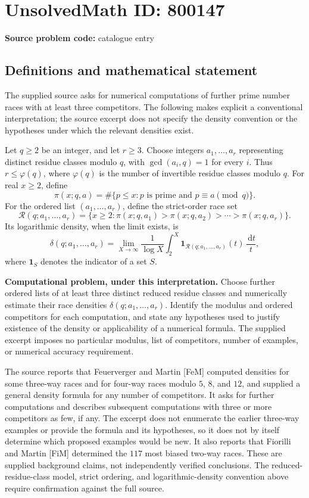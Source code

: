 \documentclass[11pt]{article}
\newcommand{\dd}{\,\mathrm{d}}
\begin{document}
\section*{UnsolvedMath ID: 800147}
\textbf{Source problem code:} catalogue entry
\subsection{Definitions and mathematical statement}
The supplied source asks for numerical computations of further prime number races with at least three competitors. The following makes explicit a conventional interpretation; the source excerpt does not specify the density convention or the hypotheses under which the relevant densities exist.

Let \(q\geq 2\) be an integer, and let \(r\geq 3\). Choose integers \(a_1,\ldots,a_r\) representing distinct residue classes modulo \(q\), with \(\gcd(a_i,q)=1\) for every \(i\). Thus \(r\leq\varphi(q)\), where \(\varphi(q)\) is the number of invertible residue classes modulo \(q\). For real \(x\geq 2\), define
\[
\pi(x;q,a)=\#\{p\leq x:p\text{ is prime and }p\equiv a\pmod q\}.
\]
For the ordered list \((a_1,\ldots,a_r)\), define the strict-order race set
\[
\mathcal R(q;a_1,\ldots,a_r)
=\{x\geq 2:\pi(x;q,a_1)>\pi(x;q,a_2)>\cdots>\pi(x;q,a_r)\}.
\]
Its logarithmic density, when the limit exists, is
\[
\delta(q;a_1,\ldots,a_r)
=\lim_{X\to\infty}\frac{1}{\log X}
\int_2^X \mathbf 1_{\mathcal R(q;a_1,\ldots,a_r)}(t)\,\frac{\dd t}{t},
\]
where \(\mathbf 1_S\) denotes the indicator of a set \(S\).

\textbf{Computational problem, under this interpretation.} Choose further ordered lists of at least three distinct reduced residue classes and numerically estimate their race densities \(\delta(q;a_1,\ldots,a_r)\). Identify the modulus and ordered competitors for each computation, and state any hypotheses used to justify existence of the density or applicability of a numerical formula. The supplied excerpt imposes no particular modulus, list of competitors, number of examples, or numerical accuracy requirement.

The source reports that Feuerverger and Martin [FeM] computed densities for some three-way races and for four-way races modulo \(5\), \(8\), and \(12\), and supplied a general density formula for any number of competitors. It asks for further computations and describes subsequent computations with three or more competitors as few, if any. The excerpt does not enumerate the earlier three-way examples or provide the formula and its hypotheses, so it does not by itself determine which proposed examples would be new. It also reports that Fiorilli and Martin [FiM] determined the \(117\) most biased two-way races. These are supplied background claims, not independently verified conclusions. The reduced-residue-class model, strict ordering, and logarithmic-density convention above require confirmation against the full source.
\end{document}
